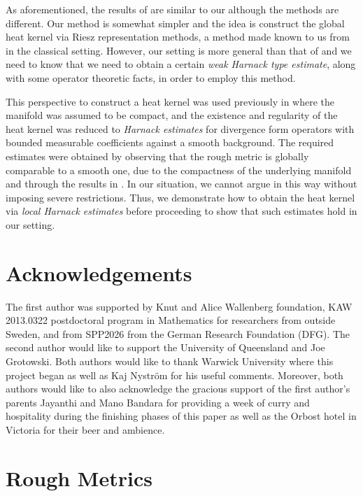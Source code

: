 \documentclass[a4paper, 12pt]{amsart}
\begin{document}
As aforementioned, the results of \cite{Norris, ERS} 
are similar to our although the methods are different. 
Our method is somewhat simpler and the 
idea is construct the global heat kernel
via Riesz representation methods, a method made known to us from 
\cite{Davies} in the classical setting. However, our setting
is more general than that of \cite{Davies} and we need to know that 
we need to obtain a certain 
\emph{weak Harnack type estimate}, along with 
some operator theoretic facts, in order to employ this method.

This perspective to construct a heat kernel was used previously in  
\cite{BCont} where the manifold was assumed to be compact,  and 
the existence and regularity of the heat kernel was
reduced to \emph{Harnack estimates} for divergence form operators
with bounded measurable coefficients against a smooth background. 
The required estimates
were obtained by observing that  
the rough metric is globally comparable to a smooth one,
due to the compactness of the underlying manifold and
through the  results  in \cite{SC}.
In our situation,  we cannot argue in this way without imposing
severe restrictions. Thus, we demonstrate
how to obtain the heat kernel via \emph{local Harnack estimates} 
before proceeding to show that such estimates 
hold in our setting.

\section*{Acknowledgements}

The first author was supported by Knut and Alice Wallenberg foundation, KAW 2013.0322 
postdoctoral program in Mathematics for researchers from outside Sweden, and from SPP2026 
from the German Research Foundation (DFG).
The second author would like to support the University of Queensland and Joe Grotowski.
Both authors would like to thank Warwick University where this project began as
well as Kaj Nyström for his useful comments.
Moreover, both authors would like to also acknowledge the gracious support of the first author's 
parents Jayanthi and Mano Bandara for providing a week of curry and hospitality during the finishing phases
of this paper as well as the  Orbost hotel in Victoria for their beer and ambience. 

\section{Rough Metrics}
\label{sec:rough_metrics}
\end{document}
